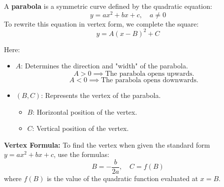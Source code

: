 \documentclass{article}
\begin{document}
\begin{definitionbox}
A \textbf{parabola} is a symmetric curve defined by the quadratic equation:  
\[
    y = ax^2 + bx + c, \quad a \neq 0
\]
To rewrite this equation in vertex form, we complete the square:  
\[
    y = A(x - B)^2 + C
\]

Here:  
\begin{itemize}
    \item \( A \): Determines the direction and "width" of the parabola.  
    \[
        A > 0 \implies \text{The parabola opens upwards.}
    \]  
    \[
        A < 0 \implies \text{The parabola opens downwards.}
    \]
    \item \( (B, C) \): Represents the vertex of the parabola.
    \begin{itemize} 
        \item[\labelitemi] \( B \): Horizontal position of the vertex.  
        \item[\labelitemi] \( C \): Vertical position of the vertex.
    \end{itemize} 
\end{itemize}

\begin{algorithmbox}

    \textbf{Vertex Formula:}  
    To find the vertex when given the standard form \( y = ax^2 + bx + c \), use the formulas:  
    \[
        B = -\frac{b}{2a}, \quad C = f(B)
    \]
    where \( f(B) \) is the value of the quadratic function evaluated at \( x = B \).
\end{algorithmbox}
\end{definitionbox}
\end{document}
